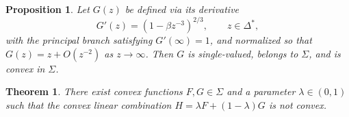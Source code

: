 \documentclass[10pt,a4paper]{amsart}
\newtheorem{theorem}{Theorem}
\newtheorem{proposition}{Proposition}
\begin{document}
\begin{proposition}\label{prop:G}
Let $G(z)$ be defined via its derivative
\begin{equation}\label{eq:def-Gprime}
G'(z) = (1 - \beta z^{-3})^{2/3}, \qquad z \in \Delta^*,
\end{equation}
with the principal branch satisfying $G'(\infty) = 1$, and normalized so that $G(z) = z + O(z^{-2})$ as $z \to \infty$. Then $G$ is single-valued, belongs to $\Sigma$, and is convex in $\Sigma$.
\end{proposition}

\begin{theorem}\label{thm:main}
There exist convex functions $F, G \in \Sigma$ and a parameter $\lambda \in (0, 1)$ such that the convex linear combination $H = \lambda F + (1-\lambda)G$ is not convex.
\end{theorem}
\end{document}
